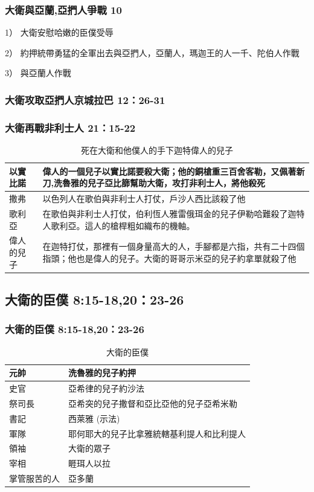 \newpage
\subsubsection{大衛與亞蘭,亞捫人爭戰 10}
\begin{description}
\setlength\itemsep{0em}
\item 1） 大衛安慰哈嫩的臣僕受辱
\item 2） 約押統帶勇猛的全軍出去與亞捫人，亞蘭人，瑪迦王的人一千、陀伯人作戰
\item 3） 與亞蘭人作戰
\end{description}

\subsubsection{大衛攻取亞捫人京城拉巴 12：26-31}
\subsubsection{大衛再戰非利士人 21：15-22}
\begin{table}[!hbp]
\centering 
\begin{tabular}{|p{}|p{}|}
\hline
\hline
以實比諾& 偉人的一個兒子以實比諾要殺大衛；他的銅槍重三百舍客勒，又佩著新刀,洗魯雅的兒子亞比篩幫助大衛，攻打非利士人，將他殺死 \\\hline
撒弗& 以色列人在歌伯與非利士人打仗，戶沙人西比該殺了他\\\hline
歌利亞& 在歌伯與非利士人打仗，伯利恆人雅雷俄珥金的兒子伊勒哈難殺了迦特人歌利亞。這人的槍桿粗如織布的機軸。\\\hline
偉人的兒子 & 在迦特打仗，那裡有一個身量高大的人，手腳都是六指，共有二十四個指頭；他也是偉人的兒子。大衛的哥哥示米亞的兒子約拿單就殺了他  \\\hline
\end{tabular}
\caption{死在大衛和他僕人的手下迦特偉人的兒子}
\end{table}

\subsection{大衛的臣僕 8:15-18,20：23-26}
\subsubsection{大衛的臣僕 8:15-18,20：23-26}
\begin{table}[!hbp]
\centering 
\begin{tabular}{|p{}|p{}|}
\hline
\hline
元帥& 洗魯雅的兒子約押 \\\hline
史官& 亞希律的兒子約沙法\\\hline
祭司長& 亞希突的兒子撒督和亞比亞他的兒子亞希米勒\\\hline
書記& 西萊雅 (示法) \\\hline
軍隊& 耶何耶大的兒子比拿雅統轄基利提人和比利提人\\\hline
領袖& 大衛的眾子\\\hline
宰相&睚珥人以拉\\\hline
掌管服苦的人&亞多蘭\\\hline
\end{tabular}
\caption{大衛的臣僕}
\end{table}
